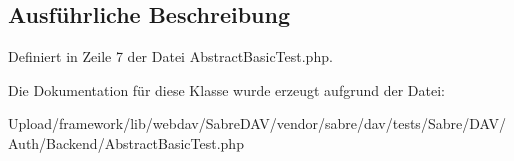 \subsection{Ausführliche Beschreibung}


Definiert in Zeile 7 der Datei Abstract\+Basic\+Test.\+php.



Die Dokumentation für diese Klasse wurde erzeugt aufgrund der Datei\+:\begin{DoxyCompactItemize}
\item 
Upload/framework/lib/webdav/\+Sabre\+D\+A\+V/vendor/sabre/dav/tests/\+Sabre/\+D\+A\+V/\+Auth/\+Backend/Abstract\+Basic\+Test.\+php\end{DoxyCompactItemize}
